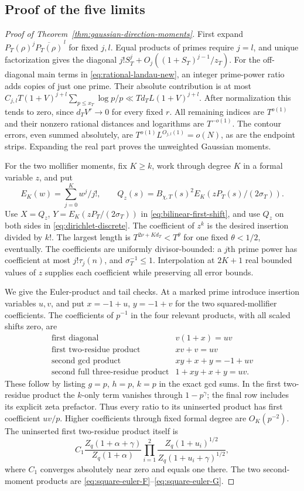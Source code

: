 \subsection{Proof of the five limits}
\begin{proof}[Proof of Theorem~\ref{thm:gaussian-direction-moments}]
First expand $P_T(\rho)^j\overline{P_T(\rho)}^{\,l}$ for fixed
$j,l$. Equal products of primes require $j=l$, and unique
factorization gives the diagonal $j!S_T^j+O_j((1+S_T)^{j-1}/z_T)$.
For the off-diagonal main terms in \eqref{eq:rational-landau-new},
an integer prime-power ratio adds copies of just one prime.
Their absolute contribution is at most
$C_{j,l}T(1+V)^{j+l}\sum_{p\le x_T}\log p/p
\ll T d_TL(1+V)^{j+l}$.
After normalization this tends to zero, since $d_TV^r\to0$ for
every fixed $r$. All remaining indices are $T^{o(1)}$ and their
nonzero rational distances and logarithms are $T^{-o(1)}$.
The contour errors, even summed absolutely, are
$T^{o(1)}L^{O_{j,l}(1)}=o(N)$, as are the endpoint strips.
Expanding the real part proves the unweighted Gaussian moments.

For the two mollifier moments, fix $K\ge k$, work through degree $K$
in a formal variable $z$, and put
\[
 E_K(w)=\sum_{j=0}^K w^j/j!,\qquad
 Q_z(s)=B_{\chi,T}(s)^2E_K(zP_T(s)/(2\sigma_T)).
\]
Use $X=Q_z$, $Y=E_K(zP_T/(2\sigma_T))$ in
\eqref{eq:bilinear-first-shift}, and use $Q_z$ on both sides in
\eqref{eq:dirichlet-discrete}. The coefficient of $z^k$ is the
desired insertion divided by $k!$. The largest length is
$T^{2\nu+Kd_T}<T^\theta$ for one fixed $\theta<1/2$, eventually.
The coefficients are uniformly divisor-bounded: a $j$th prime
power has coefficient at most $j!\tau_j(n)$, and
$\sigma_T^{-1}\le1$. Interpolation at $2K+1$ real bounded values of
$z$ supplies each coefficient while preserving all error bounds.

We give the Euler-product and tail checks. At a marked prime introduce
insertion variables $u,v$, and put $x=-1+u$, $y=-1+v$ for the
two squared-mollifier coefficients. The coefficients of $p^{-1}$ in
the four relevant products, with all scaled shifts zero, are
\[
 \begin{array}{c|c}
 \text{first diagonal}&v(1+x)=uv\\
 \text{first two-residue product}&xv+v=uv\\
 \text{second gcd product}&xy+x+y=-1+uv\\
 \text{second full three-residue product}&1+xy+x+y=uv.
 \end{array}
\]
These follow by listing $g=p$, $h=p$, $k=p$ in the exact gcd sums.
In the first two-residue product the $k$-only term vanishes through
$1-p^\gamma$; the final row includes its explicit zeta prefactor.
Thus every ratio to its uninserted product has first coefficient
$uv/p$. Higher coefficients through fixed formal degree are
$O_K(p^{-2})$. The uninserted first two-residue product itself is
\[
 C_1\frac{Z_q(1+\alpha+\gamma)}{Z_q(1+\alpha)}
       \prod_{i=1}^2
       \frac{Z_q(1+u_i)^{1/2}}{Z_q(1+u_i+\gamma)^{1/2}},
\]
where $C_1$ converges absolutely near zero and equals one there.
The two second-moment products are
\eqref{eq:square-euler-F}--\eqref{eq:square-euler-G}.


\end{proof}
